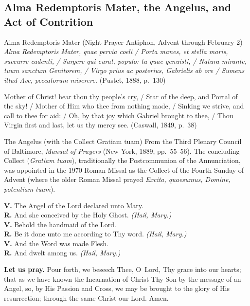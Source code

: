 \subsection{Alma Redemptoris Mater, the Angelus, and Act of Contrition}

\begin{massbox}{Alma Redemptoris Mater (Night Prayer Antiphon, Advent through February 2)}
\textit{Alma Redemptoris Mater, quae pervia coeli / Porta manes, et stella maris, succurre cadenti, / Surgere qui curat, populo: tu quae genuisti, / Natura mirante, tuum sanctum Genitorem, / Virgo prius ac posterius, Gabrielis ab ore / Sumens illud Ave, peccatorum miserere.} (Pustet, 1888, p.~130)

\medskip
Mother of Christ! hear thou thy people's cry, / Star of the deep, and Portal of the sky! / Mother of Him who thee from nothing made, / Sinking we strive, and call to thee for aid: / Oh, by that joy which Gabriel brought to thee, / Thou Virgin first and last, let us thy mercy see. (Caswall, 1849, p.~38)
\end{massbox}

\begin{massbox}{The Angelus (with the Collect Gratiam tuam)}
From the Third Plenary Council of Baltimore, \textit{Manual of Prayers} (New York, 1889, pp.~55--56). The concluding Collect (\textit{Gratiam tuam}), traditionally the Postcommunion of the Annunciation, was appointed in the 1970 Roman Missal as the Collect of the Fourth Sunday of Advent (where the older Roman Missal prayed \textit{Excita, quaesumus, Domine, potentiam tuam}).

\medskip
\textbf{V.} The Angel of the Lord declared unto Mary.\\
\textbf{R.} And she conceived by the Holy Ghost. \textit{(Hail, Mary.)}\\
\textbf{V.} Behold the handmaid of the Lord.\\
\textbf{R.} Be it done unto me according to Thy word. \textit{(Hail, Mary.)}\\
\textbf{V.} And the Word was made Flesh.\\
\textbf{R.} And dwelt among us. \textit{(Hail, Mary.)}

\smallskip
\textbf{Let us pray.} Pour forth, we beseech Thee, O~Lord, Thy grace into our hearts; that as we have known the Incarnation of Christ Thy Son by the message of an Angel, so, by His Passion and Cross, we may be brought to the glory of His resurrection; through the same Christ our Lord. Amen.
\end{massbox}

